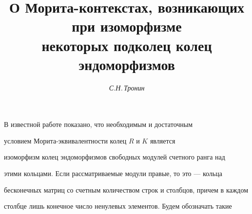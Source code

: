  




 


\setcounter{page}{50} 












\author{\it С.Н.\,Тронин} 


\title {О Морита-контекстах, возникающих при изоморфизме\\


некоторых подколец колец эндоморфизмов} 


 


\date{} 




 


\pagestyle{plain} %


 


 




 


\maketitle 








В известной работе \cite{Cam} показано, что необходимым и достаточным


условием Морита-экви\-валентности колец $R$ и $K$ является


изоморфизм колец эндоморфизмов свободных модулей счетного ранга над


этими кольцами. Если рассматриваемые модули правые, то это --- кольца


бесконечных матриц со счетным количеством строк и столбцов, причем в каждом


столбце лишь конечное число ненулевых элементов. Будем обозначать такие


